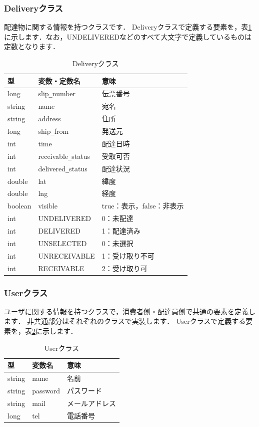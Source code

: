 \documentclass[a4j,titlepage]{jarticle}
\begin{document}
\subsubsection{Deliveryクラス}
配達物に関する情報を持つクラスです．
Deliveryクラスで定義する要素を，表\ref{deliveryTable}に示します．なお，UNDELIVEREDなどのすべて大文字で定義しているものは定数となります．\\
\begin{table}[htb]
\centering
\caption{Deliveryクラス}
\label{deliveryTable}
\begin{tabular}{|lll|}
\hline
型 & 変数・定数名 & 意味      \\ \hline
long  &  slip\verb|_|number  &  伝票番号  \\
string  & name  & 宛名     \\
string & address &  住所    \\
long & ship\verb|_|from &  発送元    \\
int & time &  配達日時    \\
int & receivable\verb|_|status &  受取可否   \\
int & delivered\verb|_|status  &  配達状況  \\
double & lat & 緯度 \\
double & lng & 経度 \\
boolean & visible  &  true：表示，false：非表示    \\
int & UNDELIVERED  & 0：未配達   \\
int & DELIVERED  &  1：配達済み  \\
int & UNSELECTED  &  0：未選択  \\
int & UNRECEIVABLE  & 1：受け取り不可   \\
int & RECEIVABLE  & 2：受け取り可   \\\hline
\end{tabular}
\end{table}
\clearpage

\subsubsection{Userクラス}
ユーザに関する情報を持つクラスで，消費者側・配達員側で共通の要素を定義します．
非共通部分はそれぞれのクラスで実装します．
Userクラスで定義する要素を，表\ref{userTable}に示します．\\
\begin{table}[htb]
\centering
\caption{Userクラス}
\label{userTable}
\begin{tabular}{|lll|}
\hline
型 & 変数名 & 意味      \\ \hline
string  & name  & 名前     \\
string & password & パスワード     \\
string & mail & メールアドレス     \\
long & tel & 電話番号     \\\hline
\end{tabular}
\end{table}
\end{document}

